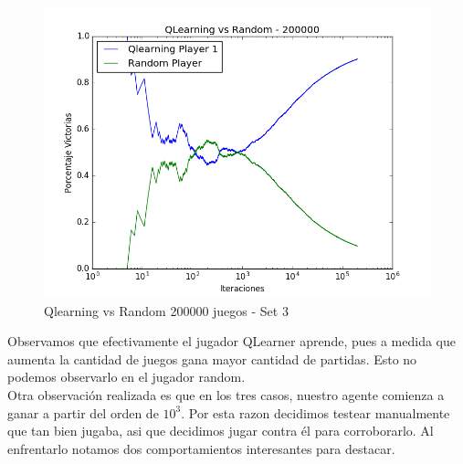 \begin{figure}[H]
 \centering
 \begin{minipage}{.45\textwidth}
	\centering
	\includegraphics[scale=0.35]{img1/QlearningVsRandom_200000_6x5_cyntia.png}
        \caption{Qlearning vs Random 200000 juegos - Set 3}
  \end{minipage}
\end{figure}



Observamos que efectivamente el jugador QLearner aprende, pues a medida que aumenta la cantidad de juegos gana mayor cantidad de partidas. Esto no podemos
observarlo en el jugador random.  \\

Otra observación realizada es que en los tres casos, nuestro agente comienza a ganar a partir del orden de $10^{3}$. Por esta razon decidimos testear manualmente que tan bien jugaba,
asi que decidimos jugar contra él para corroborarlo. Al enfrentarlo notamos dos comportamientos interesantes para destacar.

